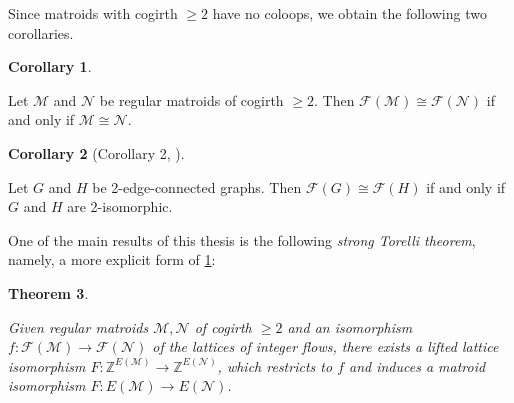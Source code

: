 \documentclass[12pt]{report}
\newtheorem{theorem}{Theorem}[chapter]
\theoremstyle{definition}
\newtheorem{corollary}[theorem]{Corollary}
\def\Z{\mathbb Z}
\def\calF{\mathcal F}
\def\calM{\mathcal M}
\def\calN{\mathcal N}
\theoremstyle{upright}
\begin{document}
Since matroids with cogirth $\geq2$ have no coloops, we obtain the following two corollaries.

\begin{corollary}\label{cor:IsometricMatroidLattices}

    Let $\calM$ and $\calN$ be regular matroids of cogirth $\geq2$.
    Then $\calF(\calM)\cong\calF(\calN)$ if and only if $\calM\cong\calN$.
    
\end{corollary}

\begin{corollary}[Corollary 2, \cite{su2010lattice}]\label{cor:IsometricGraphLattices}

    Let $G$ and $H$ be 2-edge-connected graphs.
    Then $\calF(G)\cong\calF(H)$ if and only if $G$ and $H$ are 2-isomorphic.
    
\end{corollary}

One of the main results of this thesis is the following \textit{strong Torelli theorem}, namely, a more explicit form of \cref{cor:IsometricMatroidLattices}:

\begin{theorem}\label{thm:StrongTorelliMatroid}

    Given regular matroids $\calM, \calN$ of cogirth $\geq2$ and an isomorphism $f:\calF(\calM)\to\calF(\calN)$ of the lattices of integer flows, there exists a lifted lattice isomorphism  $F:\Z^{E(\calM)}\to\Z^{E(\calN)}$, which restricts to $f$ and induces a matroid isomorphism $F:E(\calM)\to E(\calN)$.
\end{theorem}
\end{document}
